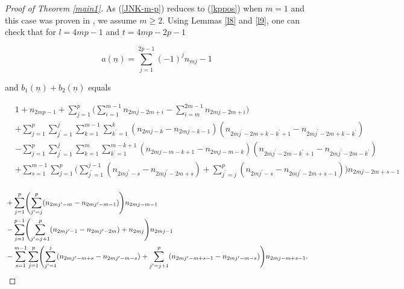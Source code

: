 \documentclass[11pt,reqno]{amsart}
\theoremstyle{definition}
\numberwithin{equation}{section}
\begin{document}
\begin{proof}[Proof of Theorem \ref{main1}]
As (\ref{JNK-m-p}) reduces to (\ref{kppos}) when $m=1$ and this case was proven in \cite{takata}, we assume $m \geq 2$. Using Lemmas \ref{l8} and \ref{l9}, one can check that for $l=4mp-1$ and $t=4mp-2p-1$

\begin{equation} \label{a2}
a({\underline{n}}) = \sum_{j=1}^{2p - 1} (-1)^j n_{mj} - 1
\end{equation}

\noindent and $b_1({\underline{n}}) + b_2({\underline{n}})$ equals

\begin{equation*} 
\begin{aligned}
& 1 + n_{2mp - 1} + \sum_{j=1}^{p} \Biggl( \sum_{i=1}^{m-1} n_{2mj - 2m + i} - \sum_{i=m}^{2m-1} n_{2mj - 2m + i} \Biggr) \\
& + \sum_{j=1}^{p} \sum_{j^{\prime}=1}^{j} \sum_{k=1}^{m-1} \sum_{k^{\prime}=1}^{k} 
(n_{2mj - k} - n_{2mj - k - 1})(n_{2mj^{\prime} - 2m + k - k^{\prime} + 1} - n_{2mj^{\prime} - 2m + k - k^{\prime}}) \\
& - \sum_{j=1}^{p} \sum_{j^{\prime}=1}^{j} \sum_{k=1}^{m} \sum_{k^{\prime}=1}^{m-k+1} 
(n_{2mj - m - k + 1} - n_{2mj - m - k})(n_{2mj^{\prime} - 2m - k^{\prime} + 1} - n_{2mj^{\prime} - 2m - k^{\prime}}) \\
& + \sum_{s=1}^{m-1} \sum_{j=1}^{p} \Biggl( \sum_{j^{\prime} = 1}^{j-1} (n_{2mj^{\prime} - s} - n_{2mj^{\prime} - 2m + s}) + \sum_{j^{\prime}=j}^{p} (n_{2mj^{\prime} - s} - n_{2mj^{\prime} - 2m + s-1} ) \Biggr) n_{2mj - 2m + s-1} \\
\end{aligned}
\end{equation*}

\begin{equation}  \label{b1b2c2}  
\begin{aligned}
& + \sum_{j=1}^{p} \Biggl( \sum_{j^{\prime}=j}^{p} (n_{2mj^{\prime} - m} - n_{2mj^{\prime} - m -1}) \Biggr) n_{2mj - m - 1} \\
& - \sum_{j=1}^{p - 1} \Biggl( \sum_{j^{\prime} = j+1}^{p} (n_{2mj^{\prime} - 1} - n_{2mj^{\prime} - 2m} ) + n_{2mj} \Biggr) n_{2mj - 1} \hphantom{xxxxxxxxxxxxxxxxxxxxxxxxx} \\
& - \sum_{s=1}^{m-1} \sum_{j=1}^{p} \Biggl( \sum_{j^{\prime}=1}^{j} (n_{2mj^{\prime} - m + s} - n_{2mj^{\prime} - m - s}) + \sum_{j^{\prime}=j+1}^{p} (n_{2mj^{\prime} - m + s-1} - n_{2mj^{\prime} - m - s}) \Biggr) n_{2mj - m + s - 1}.
\end{aligned}
\end{equation}


\end{proof}
\end{document}
